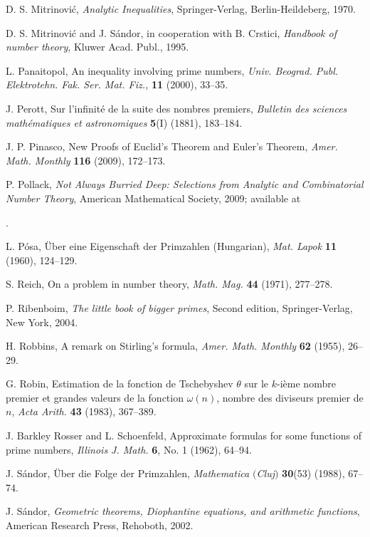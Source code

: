 \documentclass[12pt]{amsart}
\begin{document}
{\begin{thebibliography}{999}
 D. S. Mitrinovi\'c, {\it Analytic Inequalities}, 
Springer-Verlag, Berlin-Heildeberg, 1970.

 D. S. Mitrinovi\'{c} and J. S\'{a}ndor, in cooperation 
with B. Crstici,  {\it Handbook of number theory}, Kluwer Acad. Publ., 1995.

 L. Panaitopol, An inequality involving prime numbers,
{\it Univ. Beograd. Publ. Elektrotehn. Fak. Ser. Mat. Fiz.,} {\bf 11} (2000), 
33--35.

 J. Perott, Sur l'infinit\'{e} de la suite 
des nombres premiers, {\it Bulletin des sciences math\'{e}matiques  et 
astronomiques} {\bf 5}(I) (1881), 183--184. 

 J. P. Pinasco,  New Proofs of Euclid's Theorem
and Euler's Theorem, {\it Amer. Math. Monthly} {\bf 116} (2009), 172--173. 

 P. Pollack, {\it Not Always Burried Deep: Selections
from Analytic and Combinatorial Number Theory}, American Mathematical
Society, 2009; available at   

.

 L. P\'{o}sa, \"{U}ber eine Eigenschaft der Primzahlen
(Hungarian), {\it Mat. Lapok} {\bf 11} (1960), 124--129.

 S. Reich, On a problem in number theory, {\it Math. Mag.} 
{\bf 44} (1971), 277--278. 

 P. Ribenboim, {\it The little book of bigger 
primes}, Second edition, Springer-Verlag, New York, 2004. 

 H. Robbins,  A remark on Stirling's formula,  
{\it Amer. Math. Monthly} {\bf 62} (1955), 26--29. 

 G. Robin, Estimation de la fonction de Tschebyshev $\theta$
sur le $k$-i\`{e}me nombre premier et grandes valeurs de la fonction
$\omega(n)$, nombre des diviseurs premier de $n$, {\it Acta Arith.}
{\bf 43} (1983), 367--389.

 J. Barkley Rosser and L. Schoenfeld, Approximate formulas
for some functions of prime numbers, {\it Illinois J. Math.} {\bf 6},
No. 1 (1962), 64--94.

 J. S\'{a}ndor, \"{U}ber die Folge der Primzahlen,
{\it Mathematica $($Cluj$)$} {\bf 30}(53) (1988), 67--74.

 J. S\'{a}ndor, {\it Geometric theorems, Diophantine 
equations, and arithmetic functions}, American Research Press,
Rehoboth, 2002.
  

\end{thebibliography}}
\end{document}
